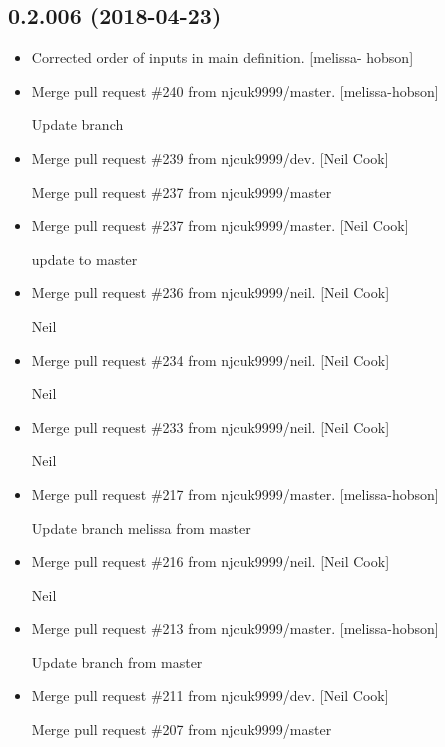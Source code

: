 \documentclass[a4paper,10pt,english]{report}
\begin{document}
\subsection{0.2.006 (2018-04-23)}
\label{\detokenize{misc/changelog:id456}}\begin{itemize}
\item {} 
Corrected order of inputs in  main definition. {[}melissa-
hobson{]}

\item {} 
Merge pull request \#240 from njcuk9999/master. {[}melissa-hobson{]}

Update branch

\item {} 
Merge pull request \#239 from njcuk9999/dev. {[}Neil Cook{]}

Merge pull request \#237 from njcuk9999/master

\item {} 
Merge pull request \#237 from njcuk9999/master. {[}Neil Cook{]}

update to master

\item {} 
Merge pull request \#236 from njcuk9999/neil. {[}Neil Cook{]}

Neil

\item {} 
Merge pull request \#234 from njcuk9999/neil. {[}Neil Cook{]}

Neil

\item {} 
Merge pull request \#233 from njcuk9999/neil. {[}Neil Cook{]}

Neil

\item {} 
Merge pull request \#217 from njcuk9999/master. {[}melissa-hobson{]}

Update branch melissa from master

\item {} 
Merge pull request \#216 from njcuk9999/neil. {[}Neil Cook{]}

Neil

\item {} 
Merge pull request \#213 from njcuk9999/master. {[}melissa-hobson{]}

Update branch from master

\item {} 
Merge pull request \#211 from njcuk9999/dev. {[}Neil Cook{]}

Merge pull request \#207 from njcuk9999/master


\end{itemize}
\end{document}
